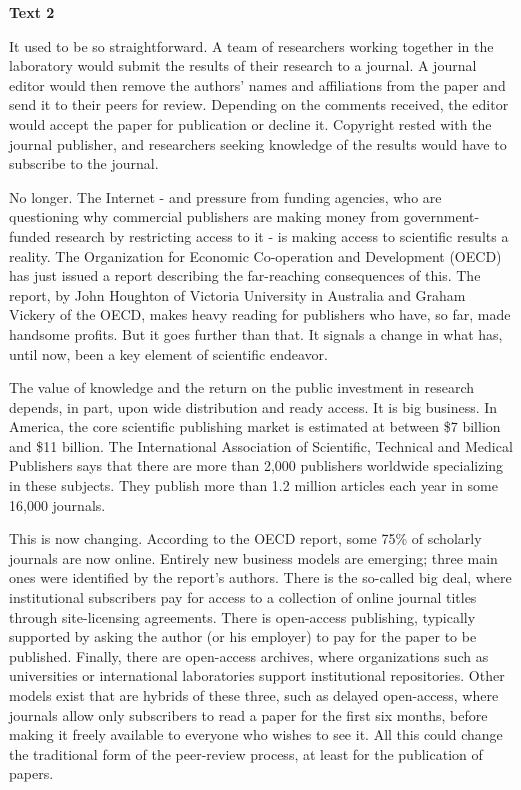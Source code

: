 \begin{center}\textbf{Text 2}\end{center}

\qquad It used to be so straightforward. A team of researchers working together in the laboratory would submit the results of their research to a journal. A journal editor would then remove the authors’ names and affiliations from the paper and send it to their peers for review. Depending on the comments received, the editor would accept the paper for publication or decline it. Copyright rested with the journal publisher, and researchers seeking knowledge of the results would have to subscribe to the journal.

\qquad No longer. The Internet - and pressure from funding agencies, who are questioning why commercial publishers are making money from government-funded research by restricting access to it - is making access to scientific results a reality. The Organization for Economic Co-operation and Development (OECD) has just issued a report describing the far-reaching consequences of this. The report, by John Houghton of Victoria University in Australia and Graham Vickery of the OECD, makes heavy reading for publishers who have, so far, made handsome profits. But it goes further than that. It signals a change in what has, until now, been a key element of scientific endeavor.

\qquad The value of knowledge and the return on the public investment in research depends, in part, upon wide distribution and ready access. It is big business. In America, the core scientific publishing market is estimated at between \$7 billion and \$11 billion. The International Association of Scientific, Technical and Medical Publishers says that there are more than 2,000 publishers worldwide specializing in these subjects. They publish more than 1.2 million articles each year in some 16,000 journals.

\qquad This is now changing. According to the OECD report, some 75\% of scholarly journals are now online. Entirely new business models are emerging; three main ones were identified by the report’s authors. There is the so-called big deal, where institutional subscribers pay for access to a collection of online journal titles through site-licensing agreements. There is open-access publishing, typically supported by asking the author (or his employer) to pay for the paper to be published. Finally, there are open-access archives, where organizations such as universities or international laboratories support institutional repositories. Other models exist that are hybrids of these three, such as delayed open-access, where journals allow only subscribers to read a paper for the first six months, before making it freely available to everyone who wishes to see it. All this could change the traditional form of the peer-review process, at least for the publication of papers.

